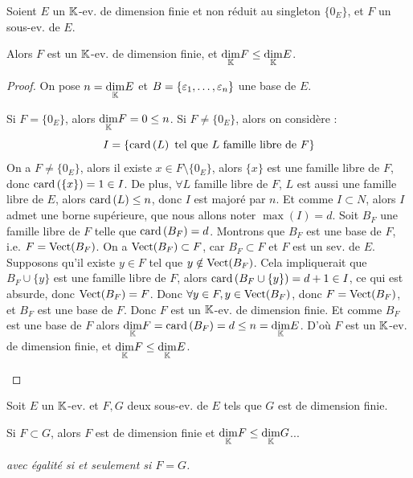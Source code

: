 \documentclass[12pt,a4paper]{report}
\begin{document}
\begin{property}
    Soient $E$ un $\mathbb{K}$-ev. de dimension finie et non réduit au singleton $\{0_E\}$, et $F$ un sous-ev. de $E$.

    Alors $F$ est un $\mathbb{K}$-ev. de dimension finie, et $\underset{\mathbb{K}}\dim F \le \underset{\mathbb{K}}\dim E$.
\end{property}

\begin{proof}
    On pose $n = \underset{\mathbb{K}}\dim E$ et $B = \{\varepsilon_1,\dots,\varepsilon_n\}$ une base de $E$.

    \begin{outline}
        \1 Si $F = \{0_E\}$, alors $\underset{\mathbb{K}}\dim F = 0 \le n$.
        \1 Si $F \ne \{0_E\}$, alors on considère :
        $$I = \{\mathrm{card}\left(L\right) \text{ tel que } L \text{ famille libre de } F\}$$
        \2 On a $F \ne \{0_E\}$, alors il existe $x \in F\setminus\{0_E\}$, alors $\{x\}$ est une famille libre de $F$, donc $\mathrm{card}\left(\{x\}\right) = 1 \in I$.
        \2 De plus, $\forall L$ famille libre de $F$, $L$ est aussi une famille libre de $E$, alors $\mathrm{card}\left(L\right) \le n$, donc $I$ est majoré par $n$.
        \2 Et comme $I \subset N$, alors $I$ admet une borne supérieure, que nous allons noter $\max(I) = d$.
        \2 Soit $B_F$ une famille libre de $F$ telle que $\mathrm{card}\left(B_F\right) = d$. Montrons que $B_F$ est une base de $F$, i.e. $F = \mathrm{Vect}(B_F)$.
            \3 On a $\mathrm{Vect}(B_F) \subset F$, car $B_F \subset F$ et $F$ est un sev. de $E$.
            \3 Supposons qu'il existe $y \in F$ tel que $y \notin \mathrm{Vect}(B_F)$.
            \3 Cela impliquerait que $B_F \cup \{y\}$ est une famille libre de $F$, alors $\mathrm{card}\left(B_F \cup \{y\}\right) = d+1 \in I$, ce qui est absurde, donc $\mathrm{Vect}(B_F) = F$.
            \3 Donc $\forall y \in F, y \in \mathrm{Vect}(B_F)$, donc $F = \mathrm{Vect}(B_F)$, et $B_F$ est une base de $F$.
            \2 Donc $F$ est un $\mathbb{K}$-ev. de dimension finie.
            \2 Et comme $B_F$ est une base de $F$ alors $\underset{\mathbb{K}}\dim F = \mathrm{card}\left(B_F\right) = d \le n = \underset{\mathbb{K}}\dim E$.
            \2 D'où $F$ est un $\mathbb{K}$-ev. de dimension finie, et $\underset{\mathbb{K}}\dim F \le \underset{\mathbb{K}}\dim E$.
    \end{outline}
\end{proof}

\begin{property}
    Soit $E$ un $\mathbb{K}$-ev. et $F,G$ deux sous-ev. de $E$ tels que $G$ est de dimension finie.

    Si $F \subset G$, alors $F$ est de dimension finie et $\underset{\mathbb{K}}\dim F \le \underset{\mathbb{K}}\dim G$...
    
    \textit{avec égalité si et seulement si $F = G$.}
\end{property}
\end{document}
